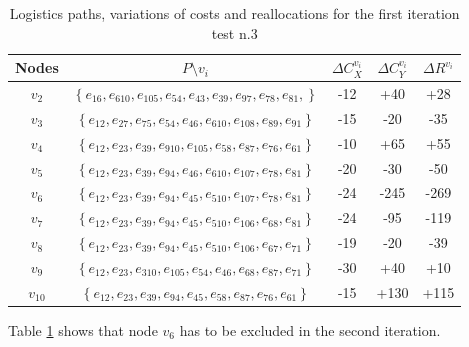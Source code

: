 \begin{table}
    \centering
    \begin{tabular}{|c|c|c|c|c|}
        \hline
        \textbf{Nodes} & \textbf{$P \setminus v_i$} & \textbf{$\Delta C_X^{v_i}$} & \textbf{$\Delta C_Y^{v_i}$} & \textbf{$\Delta R^{v_i}$} \\
        \hline
        $v_2$ & $\left\{e_{16},  e_{610}, e_{105}, e_{54}, e_{43}, e_{39}, e_{97}, e_{78}, e_{81}, \right\}$ & -12 & +40 & +28 \\
        \hline
        $v_3$ & $\left\{e_{12},  e_{27},  e_{75},  e_{54},  e_{46},  e_{610},  e_{108},  e_{89},  e_{91}  \right\}$ & -15 & -20 & -35 \\
        \hline
        $v_4$ & $\left\{e_{12},  e_{23},  e_{39},  e_{910},  e_{105},  e_{58},  e_{87},  e_{76},  e_{61}  \right\}$ & -10 & +65 & +55 \\
        \hline
        $v_5$ & $\left\{ e_{12},  e_{23},  e_{39},  e_{94},  e_{46},  e_{610},  e_{107},  e_{78},  e_{81}  \right\}$ & -20 & -30 & -50 \\
        \hline
        $v_6$ & $\left\{ e_{12},  e_{23},  e_{39},  e_{94},  e_{45},  e_{510},  e_{107},  e_{78},  e_{81}  \right\}$ & -24 & -245 & -269 \\
        \hline
        $v_7$ & $\left\{ e_{12},  e_{23},  e_{39},  e_{94},  e_{45},  e_{510},  e_{106},  e_{68},  e_{81}  \right\}$ & -24 & -95 & -119 \\
        \hline
        $v_8$ & $\left\{e_{12},  e_{23},  e_{39},  e_{94},  e_{45},  e_{510},  e_{106},  e_{67},  e_{71}   \right\}$ & -19 & -20 & -39 \\
        \hline
        $v_9$ & $\left\{e_{12},  e_{23},  e_{310},  e_{105},  e_{54},  e_{46},  e_{68},  e_{87},  e_{71}   \right\}$ & -30 & +40 & +10 \\
        \hline
        $v_10$ & $\left\{ e_{12},  e_{23},  e_{39},  e_{94},  e_{45},  e_{58},  e_{87},  e_{76},  e_{61}  \right\}$ & -15 & +130 & +115 \\
        \hline
    \end{tabular}

    \caption{Logistics paths, variations of costs and reallocations for the first iteration test n.3}
    \label{tab:reallocation-plan-first-it-test3}
\end{table}

Table \ref{tab:reallocation-plan-first-it-test3} shows that node $v_6$ has to be excluded in the second iteration.\\
